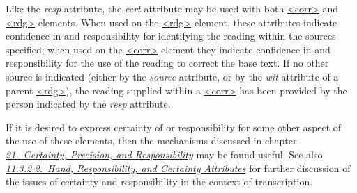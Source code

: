 Like the {\itshape resp} attribute, the {\itshape cert} attribute may be used with both \hyperref[TEI.corr]{<corr>} and \hyperref[TEI.rdg]{<rdg>} elements. When used on the \hyperref[TEI.rdg]{<rdg>} element, these attributes indicate confidence in and responsibility for identifying the reading within the sources specified; when used on the \hyperref[TEI.corr]{<corr>} element they indicate confidence in and responsibility for the use of the reading to correct the base text. If no other source is indicated (either by the {\itshape source} attribute, or by the {\itshape wit} attribute of a parent \hyperref[TEI.rdg]{<rdg>}), the reading supplied within a \hyperref[TEI.corr]{<corr>} has been provided by the person indicated by the {\itshape resp} attribute.\par
If it is desired to express certainty of or responsibility for some other aspect of the use of these elements, then the mechanisms discussed in chapter \textit{\hyperref[CE]{21.\ Certainty, Precision, and Responsibility}} may be found useful. See also \textit{\hyperref[PHHR]{11.3.2.2.\ Hand, Responsibility, and Certainty Attributes}} for further discussion of the issues of certainty and responsibility in the context of transcription.
